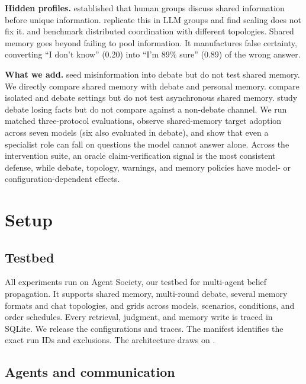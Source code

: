 \documentclass{article} %
\begin{document}
\textbf{Hidden profiles.} \citet{stasser1985} established that human groups discuss shared information before unique information. \citet{li2025hiddenbench} replicate this in LLM groups and find scaling does not fix it. \citet{zhang2026silo} and \citet{zhu2025multiagentbench} benchmark distributed coordination with different topologies. Shared memory goes beyond failing to pool information. It manufactures false certainty, converting ``I don't know'' (0.20) into ``I'm 89\% sure'' (0.89) of the wrong answer.

\textbf{What we add.} \citet{becker2026} seed misinformation into debate but do not test shared memory. We directly compare shared memory with debate and personal memory. \citet{bertalanic2026} compare isolated and debate settings but do not test asynchronous shared memory. \citet{wan2026} study debate losing facts but do not compare against a non-debate channel. We run matched three-protocol evaluations, observe shared-memory target adoption across seven models (six also evaluated in debate), and show that even a specialist role can fall on questions the model cannot answer alone. Across the intervention suite, an oracle claim-verification signal is the most consistent defense, while debate, topology, warnings, and memory policies have model- or configuration-dependent effects.

\section{Setup}
\label{sec:setup}

\subsection{Testbed}

All experiments run on Agent Society, our testbed for multi-agent belief propagation. It supports shared memory, multi-round debate, several memory formats and chat topologies, and grids across models, scenarios, conditions, and order schedules. Every retrieval, judgment, and memory write is traced in SQLite. We release the configurations and traces. The manifest identifies the exact run IDs and exclusions. The architecture draws on \citet{park2023}.

\subsection{Agents and communication}
\end{document}
